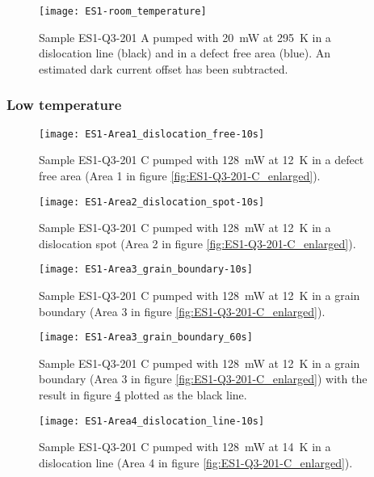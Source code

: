 \begin{figure}[H]
\centering
\texttt{[image: ES1-room\_temperature]}
\caption[ES1-Q3-201 at room temperature]{Sample ES1-Q3-201 A pumped with 20~mW at 295~K in a dislocation line (black) and in a defect free area (blue). An estimated dark current offset has been subtracted.}
\label{fig:ES1-room_temperature}%
\end{figure}


\subsubsection{Low temperature}

\begin{figure}[H]
\centering
\texttt{[image: ES1-Area1\_dislocation\_free-10s]}
\caption[ES1-Q3-201 at a defect free area]{Sample ES1-Q3-201 C pumped with 128~mW at 12~K in a defect free area (Area 1 in figure \ref{fig:ES1-Q3-201-C_enlarged}).}
\label{fig:ES1-Area1_dislocation_free-10s}%
\end{figure}

\begin{figure}[H]
\centering
\texttt{[image: ES1-Area2\_dislocation\_spot-10s]}
\caption[ES1-Q3-201 at a defect free area]{Sample ES1-Q3-201 C pumped with 128~mW at 12~K in a dislocation spot (Area 2 in figure \ref{fig:ES1-Q3-201-C_enlarged}).}
\label{fig:ES1-Area2_dislocation_spot-10s}%
\end{figure}


\begin{figure}[H]
\centering
\texttt{[image: ES1-Area3\_grain\_boundary-10s]}
\caption[ES1-Q3-201 at a grain boundary]{Sample ES1-Q3-201 C pumped with 128~mW at 12~K in a grain boundary (Area 3 in figure \ref{fig:ES1-Q3-201-C_enlarged}).}
\label{fig:ES1-Area3_grain_boundary-10s}%
\end{figure}

\begin{figure}[H]
\centering
\texttt{[image: ES1-Area3\_grain\_boundary\_60s]}
\caption[ES1-Q3-201 at a grain boundary]{Sample ES1-Q3-201 C pumped with 128~mW at 12~K in a grain boundary (Area 3 in figure \ref{fig:ES1-Q3-201-C_enlarged}) with the result in figure \ref{fig:ES1-Area3_grain_boundary-10s} plotted as the black line.}
\label{fig:ES1-Area3_grain_boundary_60s}%
\end{figure}


\begin{figure}[H]
\centering
\texttt{[image: ES1-Area4\_dislocation\_line-10s]}
\caption[ES1-Q3-201 at a dislocation line]{Sample ES1-Q3-201 C pumped with 128~mW at 14~K in a dislocation line (Area 4 in figure \ref{fig:ES1-Q3-201-C_enlarged}).}
\label{fig:ES1-Area4_dislocation_line-10s}%
\end{figure}

